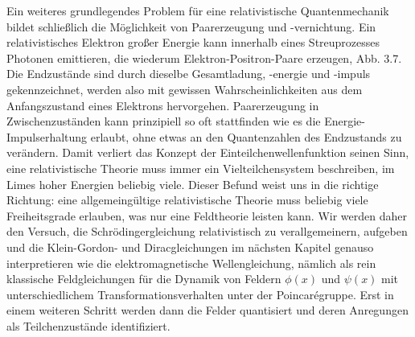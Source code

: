 \documentclass[10pt, letterpaper]{article}
\begin{document}
Ein weiteres grundlegendes Problem für eine relativistische Quantenmechanik bildet schließlich die Möglichkeit von Paarerzeugung und -vernichtung. Ein relativistisches Elektron großer Energie kann innerhalb eines Streuprozesses Photonen emittieren, die wiederum Elektron-Positron-Paare erzeugen, Abb. 3.7. Die Endzustände sind durch dieselbe Gesamtladung, -energie und -impuls gekennzeichnet, werden also mit gewissen Wahrscheinlichkeiten aus dem Anfangszustand eines Elektrons hervorgehen. Paarerzeugung in Zwischenzuständen kann prinzipiell so oft stattfinden wie es die Energie-Impulserhaltung erlaubt, ohne etwas an den Quantenzahlen des Endzustands zu verändern. Damit verliert das Konzept der Einteilchenwellenfunktion seinen Sinn, eine relativistische Theorie muss immer ein Vielteilchensystem beschreiben, im Limes hoher Energien beliebig viele. Dieser Befund weist uns in die richtige Richtung: eine allgemeingültige relativistische Theorie muss beliebig viele Freiheitsgrade erlauben, was nur eine Feldtheorie leisten kann. Wir werden daher den Versuch, die Schrödingergleichung relativistisch zu verallgemeinern, aufgeben und die Klein-Gordon- und Diracgleichungen im nächsten Kapitel genauso interpretieren wie die elektromagnetische Wellengleichung, nämlich als rein klassische Feldgleichungen für die Dynamik von Feldern $\phi(x)$ und $\psi(x)$ mit unterschiedlichem Transformationsverhalten unter der Poincarégruppe. Erst in einem weiteren Schritt werden dann die Felder quantisiert und deren Anregungen als Teilchenzustände identifiziert.
\end{document}
